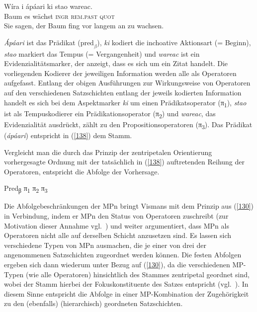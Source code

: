 \begin{exe}
	\jamwidth=5cm\relax
	\ex\label{138}
	\gll W\'{i}ra   i   \'{a}p\'{a}ari   ki    stao          wareac. \\
	Baum es wächst \textsc{ingr} \textsc{rem.past} \textsc{quot}\\
	\glt Sie sagen, der Baum fing vor langem an zu wachsen.
	\newline
\hbox{}\hfill\hbox{\citet[141]{Hengeveld1989}}	
\end{exe}	
\textit{\'{A}p\'{a}ari} ist das Prädikat ($\textrm{pred}_{\beta}$), \textit{ki} kodiert die inchoative Aktionsart (= Beginn), \textit{stao} markiert das Tempus (= Vergangenheit) und \textit{wareac} ist ein Evidenzialitätsmarker, der anzeigt, dass es sich um ein Zitat handelt. Die vorliegenden Kodierer der jeweiligen Information werden alle als Operatoren aufgefasst. Entlang der obigen Ausführungen zur Wirkungsweise von Operatoren auf den verschiedenen Satzschichten entlang der jeweils kodierten Information handelt es sich bei dem Aspektmarker \textit{ki} um einen Prädikatsoperator (π\textsubscript{1}), \textit{stao} ist als Tempuskodierer ein Prädikationsoperator (π\textsubscript{2}) und \textit{wareac}, das Evidenzialität ausdrückt, zählt zu den Propositionsoperatoren (π\textsubscript{3}). Das Prädikat (\textit{\'{a}p\'{a}ari}) entspricht in (\ref{138}) dem Stamm.

Vergleicht man die durch das Prinzip der zentripetalen Orientierung vorhergesagte Ordnung mit der tatsächlich in (\ref{138}) auftretenden Reihung der Operatoren, entspricht die Abfolge der Vorhersage.

\begin{exe}
	\ex\label{139} 
		{Pred}\textsubscript{β} π\textsubscript{1} π\textsubscript{2} π\textsubscript{3}
\end{exe}
Die Abfolgebeschränkungen der MPn bringt Vismans mit dem Prinzip aus (\ref{130}) in Verbindung, indem er MPn den Status von Operatoren zuschreibt (zur Motivation dieser Annahme vgl.\ \citealt[129--139]{Vismans1994}) und weiter argumentiert, dass MPn als Operatoren nicht alle auf derselben Schicht anzusetzen sind. Es lassen sich verschiedene Typen von MPn ausmachen, die je einer von drei der angenommenen Satzschichten zugeordnet werden können. Die festen Abfolgen ergeben sich dann wiederum unter Bezug auf (\ref{130}), da die verschiedenen MP-Typen (wie alle Operatoren) hinsichtlich des Stammes zentripetal geordnet sind, wobei der Stamm hierbei der Fokuskonstituente des Satzes entspricht (vgl.\ \citealt[142]{Vismans1994}). In diesem Sinne entspricht die Abfolge in einer MP-Kombination der Zugehörigkeit zu den (ebenfalls) (hierarchisch) geordneten Satzschichten.

